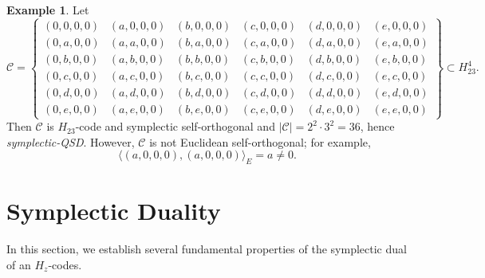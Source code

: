 \documentclass[11pt,a4paper]{article}
\theoremstyle{definition}
\newtheorem{example}[theorem]{Example}
\numberwithin{equation}{section}
\newcommand{\F}{\mathbb{F}}
\def\C{{\mathcal{C}}}
\begin{document}
\begin{example}
Let
\[
\C = \left\{
\begin{array}{llllll}
(0,0,0,0) & (a,0,0,0) & (b,0,0,0) & (c,0,0,0) & (d,0,0,0) & (e,0,0,0)\\
(0,a,0,0) & (a,a,0,0) & (b,a,0,0) & (c,a,0,0) & (d,a,0,0) & (e,a,0,0)\\
(0,b,0,0) & (a,b,0,0) & (b,b,0,0) & (c,b,0,0) & (d,b,0,0) & (e,b,0,0)\\
(0,c,0,0) & (a,c,0,0) & (b,c,0,0) & (c,c,0,0) & (d,c,0,0) & (e,c,0,0)\\
(0,d,0,0) & (a,d,0,0) & (b,d,0,0) & (c,d,0,0) & (d,d,0,0) & (e,d,0,0)\\
(0,e,0,0) & (a,e,0,0) & (b,e,0,0) & (c,e,0,0) & (d,e,0,0) & (e,e,0,0)
\end{array}
\right\}
\subset H_{23}^4.
\]
Then $\C$ is $H_{23}$-code and  symplectic self-orthogonal and $|\C|=2^2\cdot3^2=36$, hence \emph{symplectic-QSD}. 
However, $\C$ is not Euclidean self-orthogonal; for example,
\[
\langle(a,0,0,0),(a,0,0,0)\rangle_E = a \neq 0.
\]
\end{example}

\section{Symplectic Duality }\label{sec:duality}
In this section, we establish several fundamental properties of the symplectic dual of an \(H_z\)-codes. %
\end{document}
